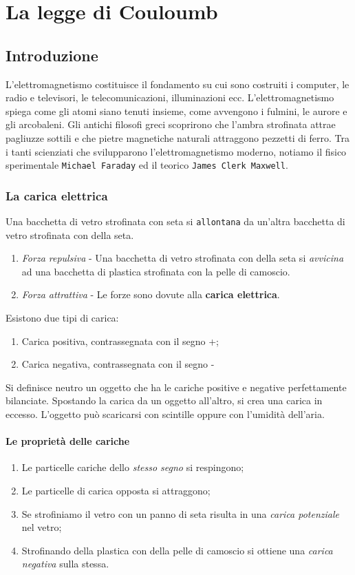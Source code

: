 \chapter{La legge di Couloumb}
\section{Introduzione}
L'elettromagnetismo costituisce il fondamento su cui sono costruiti i computer,
le radio e televisori, le telecomunicazioni, illuminazioni ecc.
L'elettromagnetismo spiega come gli atomi siano tenuti insieme, come
avvengono i fulmini, le aurore e gli arcobaleni. Gli antichi filosofi greci
scoprirono che l'ambra strofinata attrae pagliuzze sottili e che pietre
magnetiche naturali attraggono pezzetti di ferro. Tra i tanti scienziati che
svilupparono l'elettromagnetismo moderno, notiamo il fisico sperimentale
\texttt{Michael Faraday} ed il teorico \texttt{James Clerk Maxwell}.
\subsection{La carica elettrica}
Una bacchetta di vetro strofinata con seta si \texttt{allontana} da un'altra
bacchetta di vetro strofinata con della seta.
\begin{enumerate}
	\item \textit{Forza repulsiva} - Una bacchetta di vetro strofinata con
		della seta si \textit{avvicina} ad una bacchetta di plastica strofinata
		con la pelle di camoscio.
	\item \textit{Forza attrattiva} - Le forze sono dovute alla \textbf{carica
		elettrica}.
\end{enumerate}
Esistono due tipi di carica:
\begin{enumerate}
	\item Carica positiva, contrassegnata con il segno +;
	\item Carica negativa, contrassegnata con il segno -
\end{enumerate}
Si definisce neutro un oggetto che ha le cariche positive e negative
perfettamente bilanciate.
Spostando la carica da un oggetto all'altro, si crea una carica in eccesso.
L'oggetto può scaricarsi con scintille oppure con l'umidità dell'aria.
\subsubsection{Le proprietà delle cariche}
\begin{enumerate}
	\item Le particelle cariche dello \textit{stesso segno} si respingono;
	\item Le particelle di carica opposta si attraggono;
	\item Se strofiniamo il vetro con un panno di seta risulta in una
		\textit{carica potenziale} nel vetro;
	\item Strofinando della plastica con della pelle di camoscio si ottiene una
		\textit{carica negativa} sulla stessa.
\end{enumerate}
